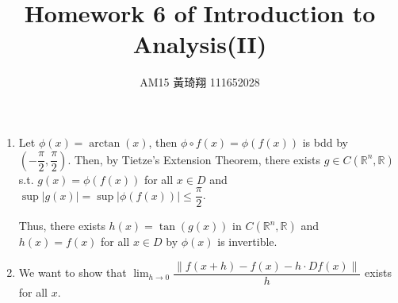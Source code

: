 \documentclass[12pt]{article}
\title{Homework 6 of Introduction to Analysis(II)}
\author{AM15 黃琦翔 111652028}
\begin{document}
\maketitle
\begin{enumerate}
    \item Let $\phi(x) = \arctan(x)$, then $\phi \circ f(x) = \phi(f(x))$ is bdd by $(-\dfrac{\pi}{2}, \dfrac{\pi}{2})$.
    Then, by Tietze's Extension Theorem, there exists $g \in C(\mathbb{R}^n, \mathbb{R})$ s.t. 
    $g(x) = \phi(f(x))$ for all $x\in D$ and $\sup|g(x)| = \sup |\phi(f(x))|\leq \dfrac{\pi}{2}$.

    Thus, there exists $h(x) = \tan(g(x))$ in $C(\mathbb{R}^n, \mathbb{R})$ and $h(x) = f(x)$ for all $x\in D$ by 
    $\phi(x)$ is invertible.

    \item We want to show that $\displaystyle\lim_{h\to 0} \dfrac{\| f(x+h) - f(x) - h\cdot Df(x)\|}{h}$ exists for all $x$.
\end{enumerate}
\end{document}
